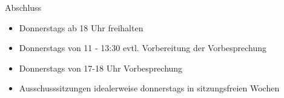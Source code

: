 \documentclass{beamer}
\begin{document}
\begin{frame}{Abschluss}
    \begin{itemize}
        \item Donnerstags ab 18 Uhr freihalten
        \item Donnerstags von 11 - 13:30 evtl. Vorbereitung der Vorbesprechung
        \item Donnerstags von 17-18 Uhr Vorbesprechung
        \item Ausschusssitzungen idealerweise donnerstags in sitzungsfreien Wochen
    \end{itemize}
\end{frame}
\end{document}
